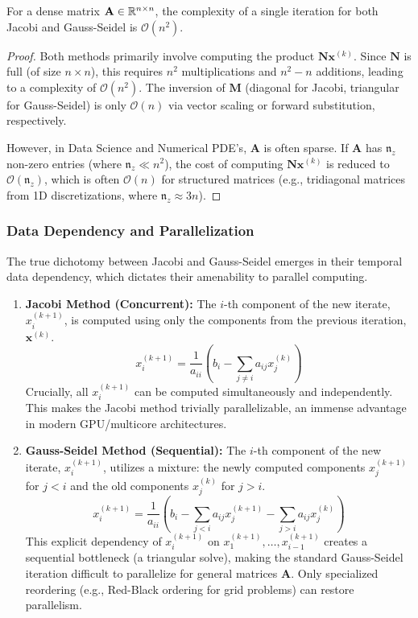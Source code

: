 \begin{proposition}
For a dense matrix $\mathbf{A} \in \mathbb{R}^{n \times n}$, the complexity of a single iteration for both Jacobi and Gauss-Seidel is $\mathcal{O}(n^2)$.
\end{proposition}
\begin{proof}
Both methods primarily involve computing the product $\mathbf{N}\mathbf{x}^{(k)}$. Since $\mathbf{N}$ is full (of size $n \times n$), this requires $n^2$ multiplications and $n^2 - n$ additions, leading to a complexity of $\mathcal{O}(n^2)$. The inversion of $\mathbf{M}$ (diagonal for Jacobi, triangular for Gauss-Seidel) is only $\mathcal{O}(n)$ via vector scaling or forward substitution, respectively.

However, in Data Science and Numerical PDE's, $\mathbf{A}$ is often sparse. If $\mathbf{A}$ has $\mathfrak{n}_z$ non-zero entries (where $\mathfrak{n}_z \ll n^2$), the cost of computing $\mathbf{N}\mathbf{x}^{(k)}$ is reduced to $\mathcal{O}(\mathfrak{n}_z)$, which is often $\mathcal{O}(n)$ for structured matrices (e.g., tridiagonal matrices from 1D discretizations, where $\mathfrak{n}_z \approx 3n$).
\end{proof}

\subsubsection{Data Dependency and Parallelization}

The true dichotomy between Jacobi and Gauss-Seidel emerges in their temporal data dependency, which dictates their amenability to parallel computing.

\begin{enumerate}
    \item \textbf{Jacobi Method (Concurrent):} The $i$-th component of the new iterate, $x_i^{(k+1)}$, is computed using only the components from the previous iteration, $\mathbf{x}^{(k)}$.
    \[ x_i^{(k+1)} = \frac{1}{a_{ii}} \left( b_i - \sum_{j \ne i} a_{ij} x_j^{(k)} \right) \]
    Crucially, all $x_i^{(k+1)}$ can be computed simultaneously and independently. This makes the Jacobi method trivially parallelizable, an immense advantage in modern GPU/multicore architectures.
    
    \item \textbf{Gauss-Seidel Method (Sequential):} The $i$-th component of the new iterate, $x_i^{(k+1)}$, utilizes a mixture: the newly computed components $x_j^{(k+1)}$ for $j < i$ and the old components $x_j^{(k)}$ for $j > i$.
    \[ x_i^{(k+1)} = \frac{1}{a_{ii}} \left( b_i - \sum_{j < i} a_{ij} x_j^{(k+1)} - \sum_{j > i} a_{ij} x_j^{(k)} \right) \]
    This explicit dependency of $x_i^{(k+1)}$ on $x_1^{(k+1)}, \dots, x_{i-1}^{(k+1)}$ creates a sequential bottleneck (a triangular solve), making the standard Gauss-Seidel iteration difficult to parallelize for general matrices $\mathbf{A}$. Only specialized reordering (e.g., Red-Black ordering for grid problems) can restore parallelism.
\end{enumerate}

